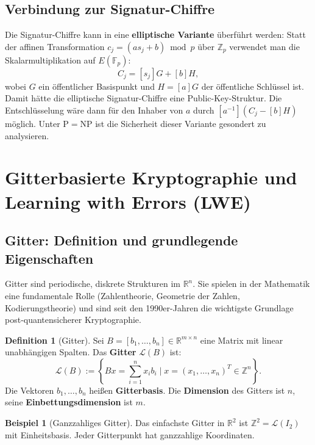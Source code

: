 ﻿\documentclass[a4paper,12pt]{scrreprt}
\theoremstyle{definition}
\newtheorem{definition}{Definition}[section]
\newtheorem{beispiel}{Beispiel}[section]
\begin{document}
\subsection{Verbindung zur Signatur-Chiffre}

Die Signatur-Chiffre kann in eine \textbf{elliptische Variante} überführt werden: Statt der affinen Transformation $c_j = (as_j + b)\bmod p$ über $\mathbb{Z}_p$ verwendet man die Skalarmultiplikation auf $E(\mathbb{F}_p)$:
\[
C_j = [s_j]G + [b]H,
\]
wobei $G$ ein öffentlicher Basispunkt und $H = [a]G$ der öffentliche Schlüssel ist. Damit hätte die elliptische Signatur-Chiffre eine Public-Key-Struktur. Die Entschlüsselung wäre dann für den Inhaber von $a$ durch $[a^{-1}](C_j - [b]H)$ möglich. Unter $\mathrm{P}=\mathrm{NP}$ ist die Sicherheit dieser Variante gesondert zu analysieren.

\section{Gitterbasierte Kryptographie und Learning with Errors (LWE)}

\subsection{Gitter: Definition und grundlegende Eigenschaften}

Gitter sind periodische, diskrete Strukturen im $\mathbb{R}^n$. Sie spielen in der Mathematik eine fundamentale Rolle (Zahlentheorie, Geometrie der Zahlen, Kodierungstheorie) und sind seit den 1990er-Jahren die wichtigste Grundlage post-quantensicherer Kryptographie.

\begin{definition}[Gitter]
Sei $B = [b_1, \ldots, b_n] \in \mathbb{R}^{m \times n}$ eine Matrix mit linear unabhängigen Spalten. Das \textbf{Gitter} $\mathcal{L}(B)$ ist:
\[
\mathcal{L}(B) := \left\{ Bx = \sum_{i=1}^n x_i b_i \;\Big|\; x = (x_1,\ldots,x_n)^T \in \mathbb{Z}^n \right\}.
\]
Die Vektoren $b_1,\ldots,b_n$ heißen \textbf{Gitterbasis}. Die \textbf{Dimension} des Gitters ist $n$, seine \textbf{Einbettungsdimension} ist $m$.
\end{definition}

\begin{beispiel}[Ganzzahliges Gitter]
Das einfachste Gitter in $\mathbb{R}^2$ ist $\mathbb{Z}^2 = \mathcal{L}(I_2)$ mit Einheitsbasis. Jeder Gitterpunkt hat ganzzahlige Koordinaten.
\end{beispiel}
\end{document}

